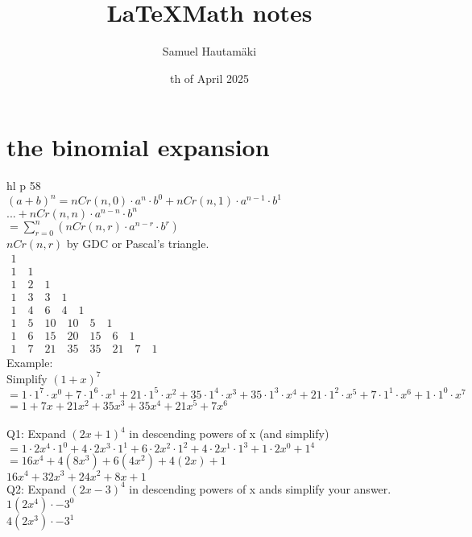 \documentclass{article}
\title{\LaTeX Math notes}
\author{Samuel Hautamäki}
\date{th of April 2025}
\begin{document}
  \maketitle
   
  \section{the binomial expansion}
  hl p 58\\
  $(a+b)^n=nCr(n,0)\cdot a^n\cdot b^0+nCr(n,1)\cdot a^{n-1}\cdot b^1$\\
  $... + nCr(n,n)\cdot a^{n-n}\cdot b^{n}$\\
  $=\sum_{r=0}^{n}(nCr(n,r)\cdot a^{n-r}\cdot b^r)$\\
  $nCr(n,r)$ by GDC or Pascal's triangle.\\
$
    \begin{array}{c}
 1 \\
 1 \quad 1 \\
 1 \quad 2 \quad 1 \\
 1 \quad 3 \quad 3 \quad 1 \\
 1 \quad 4 \quad 6 \quad 4 \quad 1 \\
 1 \quad 5 \quad 10 \quad 10 \quad 5 \quad 1 \\
 1 \quad 6 \quad 15 \quad 20 \quad 15 \quad 6 \quad 1 \\
 1 \quad 7 \quad 21 \quad 35 \quad 35 \quad 21 \quad 7 \quad 1
\end{array}
  $\\
  Example: \\
  Simplify $(1+x)^7$\\
  $=1\cdot1^7\cdot x^0+7\cdot1^6\cdot x^1+21\cdot 1^5\cdot x^2+35\cdot 1^4\cdot x^3+35 \cdot 1^3\cdot x^4+21\cdot 1^2\cdot x^5+7\cdot 1^1\cdot x^6+1\cdot 1^0\cdot x^7$\\
  $=1+7x+21x^2+35x^3+35x^4+21x^5+7x^6$\\
  \\
  Q1: Expand $(2x+1)^4$ in descending powers of x (and simplify)\\
  $=1\cdot 2x^4\cdot 1^0+4\cdot 2x^3\cdot 1^1+6\cdot 2x^2\cdot 1^2+4\cdot 2x^1\cdot 1^3+1\cdot 2x^0+1^4$\\
  $=16x^4+4(8x^3)+6(4x^2)+4(2x)+1$\\
  $16x^4+32x^3+24x^2+8x+1$\\
  Q2: Expand $(2x-3)^4$ in descending powers of x ands simplify your answer.\\
  $1(2x^4)\cdot-3^0$\\
  $4(2x^3)\cdot-3^1$\\
\end{document}
